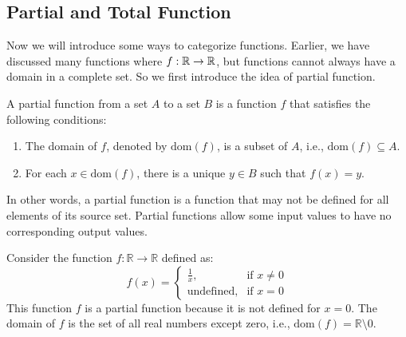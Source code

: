 \subsection{Partial and Total Function}
Now we will introduce some ways to categorize functions. Earlier, we have discussed many functions where $f: \mathbb{R} \to \mathbb{R}$, but functions cannot always 
have a domain in a complete set. So we first introduce the idea of partial function.
\begin{definition}
	A partial function from a set $A$ to a set $B$ is a function $f$ that satisfies the following conditions:
	\begin{enumerate}
		\item The domain of $f$, denoted by $\text{dom}(f)$, is a subset of $A$, i.e., $\text{dom}(f) \subseteq A$.
		\item For each $x \in \text{dom}(f)$, there is a unique $y \in B$ such that $f(x) = y$.
	\end{enumerate}
	
	In other words, a partial function is a function that may not be defined for all elements of its source set. Partial functions allow some input values to have no corresponding output values.
\end{definition}
\begin{example}
	Consider the function $f: \mathbb{R} \to \mathbb{R}$ defined as:
	$$
	f(x) = \begin{cases}
		\frac{1}{x}, & \text{if } x \neq 0 \\
		\text{undefined}, & \text{if } x = 0
	\end{cases}
	$$
	This function $f$ is a partial function because it is not defined for $x = 0$. The domain of $f$ is the set of all real numbers except zero, i.e., $\text{dom}(f) = \mathbb{R} \setminus {0}$.
\end{example}

